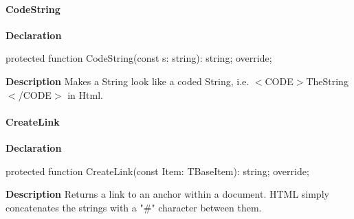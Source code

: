 \documentclass{report}
\newif\ifpdf
\begin{document}
\paragraph*{CodeString}\hspace*{\fill}

\label{PasDoc_GenHtml.TGenericHTMLDocGenerator-CodeString}
\begin{list}{}{
\setlength{\itemindent}{0cm}
\setlength{\listparindent}{0cm}
\setlength{\leftmargin}{\evensidemargin}
\addtolength{\leftmargin}{\tmplength}
\settowidth{\labelsep}{X}
\addtolength{\leftmargin}{\labelsep}
\setlength{\labelwidth}{\tmplength}
}
\item[\textbf{Declaration}\hfill]
\ifpdf
\begin{flushleft}
\fi
\begin{ttfamily}
protected function CodeString(const s: string): string; override;\end{ttfamily}

\ifpdf
\end{flushleft}
\fi

\par
\item[\textbf{Description}]
Makes a String look like a coded String, i.e. {$<$}CODE{$>$}TheString{$<$}/CODE{$>$} in Html.

\end{list}
\paragraph*{CreateLink}\hspace*{\fill}

\label{PasDoc_GenHtml.TGenericHTMLDocGenerator-CreateLink}
\begin{list}{}{
\setlength{\itemindent}{0cm}
\setlength{\listparindent}{0cm}
\setlength{\leftmargin}{\evensidemargin}
\addtolength{\leftmargin}{\tmplength}
\settowidth{\labelsep}{X}
\addtolength{\leftmargin}{\labelsep}
\setlength{\labelwidth}{\tmplength}
}
\item[\textbf{Declaration}\hfill]
\ifpdf
\begin{flushleft}
\fi
\begin{ttfamily}
protected function CreateLink(const Item: TBaseItem): string; override;\end{ttfamily}

\ifpdf
\end{flushleft}
\fi

\par
\item[\textbf{Description}]
Returns a link to an anchor within a document. HTML simply concatenates the strings with a "{\#}" character between them.

\end{list}
\end{document}
